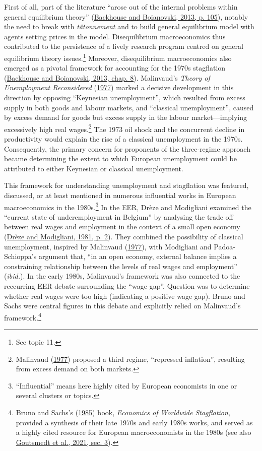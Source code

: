 \documentclass[
  12pt,
  onecolumn]{article}
\begin{document}
First of all, part of the literature ``arose out of the internal
problems within general equilibrium theory''
(\protect\hyperlink{ref-backhouseboianovski2013}{Backhouse and
Boianovski, 2013, p. 105}), notably the need to break with
\emph{tâtonnement} and to build general equilibrium model with agents
setting prices in the model. Disequilibrium macroeconomics thus
contributed to the persistence of a lively research program centred on
general equilibrium theory issues.\footnote{See topic 11.} Moreover,
disequilibrium macroeconomics also emerged as a pivotal framework for
accounting for the 1970s stagflation
(\protect\hyperlink{ref-backhouseboianovski2013}{Backhouse and
Boianovski, 2013, chap. 8}). Malinvaud's \emph{Theory of Unemployment
Reconsidered} (\protect\hyperlink{ref-malinvaud1977}{1977}) marked a
decisive development in this direction by opposing ``Keynesian
unemployment'', which resulted from excess supply in both goods and
labour markets, and ``classical unemployment'', caused by excess demand
for goods but excess supply in the labour market---implying excessively
high real wages.\footnote{Malinvaud
  (\protect\hyperlink{ref-malinvaud1977}{1977}) proposed a third regime,
  ``repressed inflation'', resulting from excess demand on both markets.}
The 1973 oil shock and the concurrent decline in productivity would
explain the rise of a classical unemployment in the 1970s. Consequently,
the primary concern for proponents of the three-regime approach became
determining the extent to which European unemployment could be
attributed to either Keynesian or classical unemployment.

This framework for understanding unemployment and stagflation was
featured, discussed, or at least mentioned in numerous influential works
in European macroeconomics in the 1980s.\footnote{``Influential'' means
  here highly cited by European economists in one or several clusters or
  topics.} In the EER, Drèze and Modigliani examined the ``current state
of underemployment in Belgium'' by analysing the trade off between real
wages and employment in the context of a small open economy
(\protect\hyperlink{ref-dreze1981}{Drèze and Modigliani, 1981, p. 2}).
They combined the possibility of classical unemployment, inspired by
Malinvaud (\protect\hyperlink{ref-malinvaud1977}{1977}), with Modigliani
and Padoa-Schioppa's argument that, ``in an open economy, external
balance implies a constraining relationship between the levels of real
wages and employment'' (\emph{ibid.}). In the early 1980s, Malinvaud's
framework was also connected to the reccurring EER debate surrounding
the ``wage gap''. Question was to determine whether real wages were too
high (indicating a positive wage gap). Bruno and Sachs were central
figures in this debate and explicitly relied on Malinvaud's
framework.\footnote{Bruno and Sachs's
  (\protect\hyperlink{ref-brunosachs1985}{1985}) book, \emph{Economics
  of Worldwide Stagflation}, provided a synthesis of their late 1970s
  and early 1980s works, and served as a highly cited resource for
  European macroeconomists in the 1980s (see also
  \protect\hyperlink{ref-goutsmedt2021}{Goutsmedt et al., 2021, sec.
  3}).}
\end{document}
